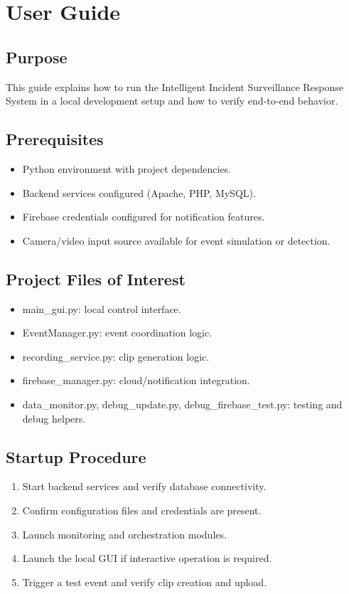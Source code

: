 \chapter{User Guide}
\section{Purpose}
This guide explains how to run the Intelligent Incident Surveillance Response System in a local development setup and how to verify end-to-end behavior.

\section{Prerequisites}
\begin{itemize}
\item Python environment with project dependencies.
\item Backend services configured (Apache, PHP, MySQL).
\item Firebase credentials configured for notification features.
\item Camera/video input source available for event simulation or detection.
\end{itemize}

\section{Project Files of Interest}
\begin{itemize}
\item main\_gui.py: local control interface.
\item EventManager.py: event coordination logic.
\item recording\_service.py: clip generation logic.
\item firebase\_manager.py: cloud/notification integration.
\item data\_monitor.py, debug\_update.py, debug\_firebase\_test.py: testing and debug helpers.
\end{itemize}

\section{Startup Procedure}
\begin{enumerate}
\item Start backend services and verify database connectivity.
\item Confirm configuration files and credentials are present.
\item Launch monitoring and orchestration modules.
\item Launch the local GUI if interactive operation is required.
\item Trigger a test event and verify clip creation and upload.
\end{enumerate}

